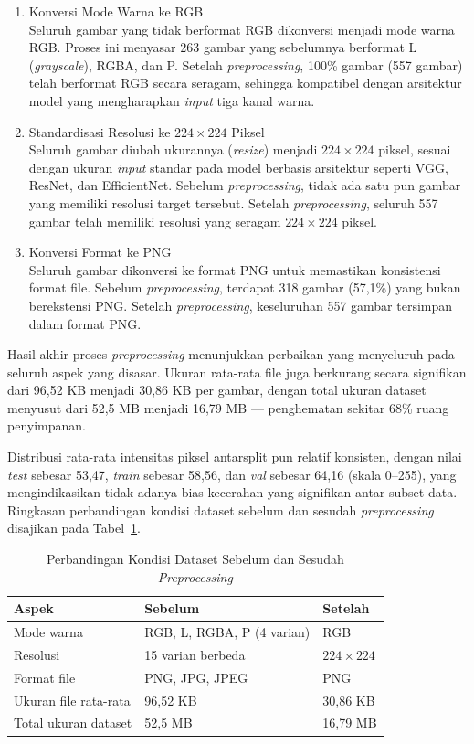 \begin{enumerate}
	\item Konversi Mode Warna ke RGB\\
	Seluruh gambar yang tidak berformat RGB dikonversi menjadi mode warna RGB. Proses ini menyasar 263 gambar yang sebelumnya berformat L (\textit{grayscale}), RGBA, dan P. Setelah \textit{preprocessing}, 100\% gambar (557 gambar) telah berformat RGB secara seragam, sehingga kompatibel dengan arsitektur model yang mengharapkan \textit{input} tiga kanal warna.
	
	\item Standardisasi Resolusi ke $224 \times 224$ Piksel\\
	Seluruh gambar diubah ukurannya (\textit{resize}) menjadi $224 \times 224$ piksel, sesuai dengan ukuran \textit{input} standar pada model berbasis arsitektur seperti VGG, ResNet, dan EfficientNet. Sebelum \textit{preprocessing}, tidak ada satu pun gambar yang memiliki resolusi target tersebut. Setelah \textit{preprocessing}, seluruh 557 gambar telah memiliki resolusi yang seragam $224 \times 224$ piksel.
	
	\item Konversi Format ke PNG\\
	Seluruh gambar dikonversi ke format PNG untuk memastikan konsistensi format file. Sebelum \textit{preprocessing}, terdapat 318 gambar (57,1\%) yang bukan berekstensi PNG. Setelah \textit{preprocessing}, keseluruhan 557 gambar tersimpan dalam format PNG.
\end{enumerate}

Hasil akhir proses \textit{preprocessing} menunjukkan perbaikan yang menyeluruh pada seluruh aspek yang disasar. Ukuran rata-rata file juga berkurang secara signifikan dari 96,52 KB menjadi 30,86 KB per gambar, dengan total ukuran dataset menyusut dari 52,5 MB menjadi 16,79 MB --- penghematan sekitar 68\% ruang penyimpanan. 

Distribusi rata-rata intensitas piksel antarsplit pun relatif konsisten, dengan nilai \textit{test} sebesar 53,47, \textit{train} sebesar 58,56, dan \textit{val} sebesar 64,16 (skala 0--255), yang mengindikasikan tidak adanya bias kecerahan yang signifikan antar subset data. Ringkasan perbandingan kondisi dataset sebelum dan sesudah \textit{preprocessing} disajikan pada Tabel~\ref{tab:preprocessing}.

\begin{table}[htbp]
	\centering
	\caption{Perbandingan Kondisi Dataset Sebelum dan Sesudah \textit{Preprocessing}}
	\label{tab:preprocessing}
	\begin{tabular}{|l|l|l|}
		\hline
		Aspek & Sebelum & Setelah \\ \hline
		Mode warna & RGB, L, RGBA, P (4 varian) & RGB \\ \hline
		Resolusi & 15 varian berbeda & $224 \times 224$ \\ \hline
		Format file & PNG, JPG, JPEG & PNG \\ \hline
		Ukuran file rata-rata & 96,52 KB & 30,86 KB \\ \hline
		Total ukuran dataset & 52,5 MB & 16,79 MB \\ \hline
	\end{tabular}
\end{table}

